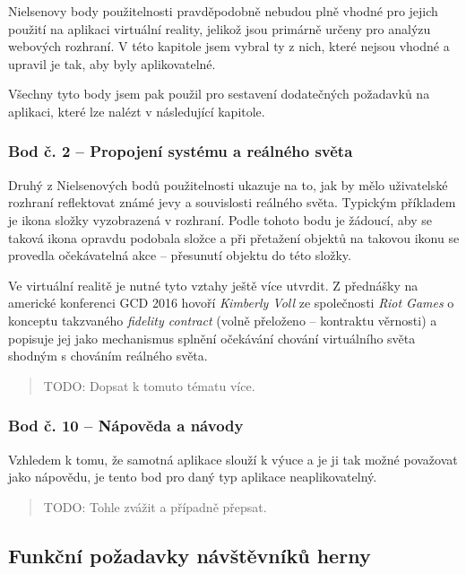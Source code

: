 Nielsenovy body použitelnosti pravděpodobně nebudou plně vhodné pro
jejich použití na aplikaci virtuální reality, jelikož jsou primárně
určeny pro analýzu webových rozhraní. V této kapitole jsem vybral ty z
nich, které nejsou vhodné a upravil je tak, aby byly aplikovatelné.

Všechny tyto body jsem pak použil pro sestavení dodatečných požadavků na
aplikaci, které lze nalézt v následující kapitole.

\subsubsection{Bod č. 2 -- Propojení systému a reálného
světa}\label{bod-ux10d.-2-propojenuxed-systuxe9mu-a-reuxe1lnuxe9ho-svux11bta}

Druhý z Nielsenových bodů použitelnosti ukazuje na to, jak by mělo
uživatelské rozhraní reflektovat známé jevy a souvislosti reálného
světa. Typickým příkladem je ikona složky vyzobrazená v rozhraní. Podle
tohoto bodu je žádoucí, aby se taková ikona opravdu podobala složce a
při přetažení objektů na takovou ikonu se provedla očekávatelná akce --
přesunutí objektu do této složky.

Ve virtuální realitě je nutné tyto vztahy ještě více utvrdit. Z
přednášky na americké konferenci GCD 2016 hovoří \emph{Kimberly Voll} ze
společnosti \emph{Riot Games} o konceptu takzvaného \emph{fidelity
contract} (volně přeloženo -- kontraktu věrnosti) a popisuje jej jako
mechanismus splnění očekávání chování virtuálního světa shodným s
chováním reálného světa.

\begin{quote}
TODO: Dopsat k tomuto tématu více.
\end{quote}

\subsubsection{Bod č. 10 -- Nápověda a
návody}\label{bod-ux10d.-10-nuxe1povux11bda-a-nuxe1vody}

Vzhledem k tomu, že samotná aplikace slouží k výuce a je ji tak možné
považovat jako nápovědu, je tento bod pro daný typ aplikace
neaplikovatelný.

\begin{quote}
TODO: Tohle zvážit a případně přepsat.
\end{quote}

\subsection{Funkční požadavky návštěvníků
herny}\label{funkux10dnuxed-poux17eadavky-nuxe1vux161tux11bvnuxedkux16f-herny}

